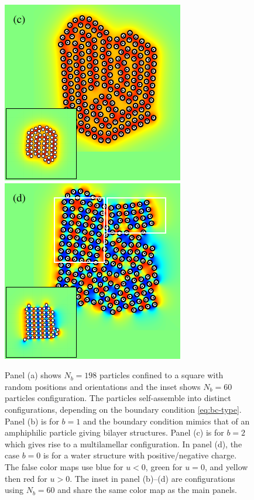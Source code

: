 \documentclass[prb,preprint,showpacs,preprintnumbers,amsmath,amssymb,longbibliography]{revtex4-1}
\begin{document}
\begin{figure}[h!]
\begin{center}
  \includegraphics[height=0.3\textheight]{Nb198c_eta_inset.pdf}
  \includegraphics[height=0.3\textheight]{Nb198d_eta_inset.pdf}
\end{center}
\begin{caption}{\label{fig:relax}
  Panel (a) shows $N_b = 198$ particles confined to a square with random 
  positions and orientations and the inset shows $N_b=60$ particles configuration.
  The particles self-assemble into distinct configurations,
  depending on the boundary condition \eqref{eq:bc-type}.
  Panel (b) is for $b=1$ and the boundary condition mimics that
  of an amphiphilic particle giving bilayer structures. 
  Panel (c) is for $b=2$ which gives rise to a multilamellar configuration. 
  In panel (d), the case $b = 0$ is for a water structure with
  positive/negative charge. 
  The false color maps use blue for $u < 0$, green for $u = 0$, and yellow then red for $u > 0$.
  The inset in panel (b)--(d) are configurations using $N_b=60$ and share the same color map
  as the main panels.}
\end{caption}
\end{figure}
\end{document}
